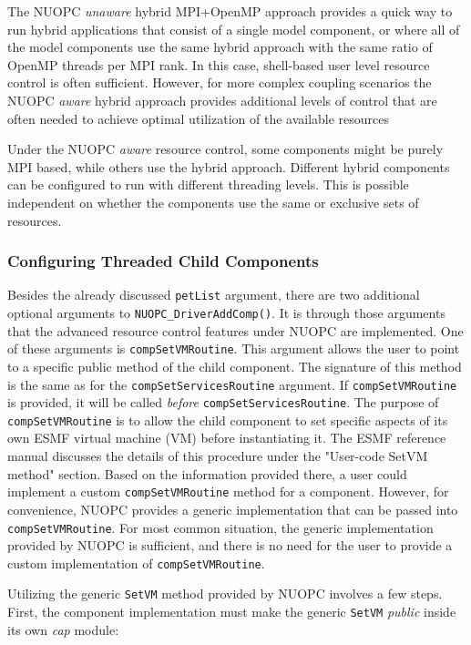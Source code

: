 The NUOPC {\em unaware} hybrid MPI+OpenMP approach provides a quick way to run hybrid applications that consist of a single model component, or where all of the model components use the same hybrid approach with the same ratio of OpenMP threads per MPI rank. In this case, shell-based user level resource control is often sufficient. However, for more complex coupling scenarios the NUOPC {\em aware} hybrid approach provides additional levels of control that are often needed to achieve optimal utilization of the available resources

Under the NUOPC {\em aware} resource control, some components might be purely MPI based, while others use the hybrid approach. Different hybrid components can be configured to run with different threading levels. This is possible independent on whether the components use the same or exclusive sets of resources.

\subsubsection{Configuring Threaded Child Components}

Besides the already discussed {\tt petList} argument, there are two additional optional arguments to {\tt NUOPC\_DriverAddComp()}. It is through those arguments that the advanced resource control features under NUOPC are implemented. One of these arguments is {\tt compSetVMRoutine}. This argument allows the user to point to a specific public method of the child component. The signature of this method is the same as for the {\tt compSetServicesRoutine} argument. If {\tt compSetVMRoutine} is provided, it will be called {\em before} {\tt compSetServicesRoutine}. The purpose of {\tt compSetVMRoutine} is to allow the child component to set specific aspects of its own ESMF virtual machine (VM) before instantiating it. The ESMF reference manual discusses the details of this procedure under the "User-code SetVM method" section. Based on the information provided there, a user could implement a custom {\tt compSetVMRoutine} method for a component. However, for convenience, NUOPC provides a generic implementation that can be passed into {\tt compSetVMRoutine}. For most common situation, the generic implementation provided by NUOPC is sufficient, and there is no need for the user to provide a custom implementation of {\tt compSetVMRoutine}.

Utilizing the generic {\tt SetVM} method provided by NUOPC involves a few steps. First, the component implementation must make the generic {\tt SetVM} {\em public} inside its own {\em cap} module:

